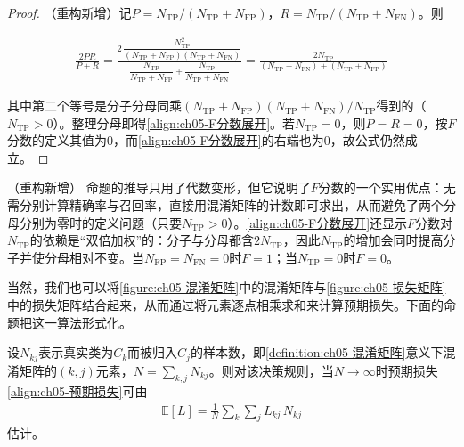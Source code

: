 \documentclass[../../main.tex]{subfiles}
\begin{document}
\begin{proof}
（重构新增）记$P=N_{\mathrm{TP}}/(N_{\mathrm{TP}}+N_{\mathrm{FP}})$，$R=N_{\mathrm{TP}}/(N_{\mathrm{TP}}+N_{\mathrm{FN}})$。则

\begin{align}
  \frac{2PR}{P+R}=\frac{2\,\dfrac{N_{\mathrm{TP}}^{2}}{(N_{\mathrm{TP}}+N_{\mathrm{FP}})(N_{\mathrm{TP}}+N_{\mathrm{FN}})}}{\dfrac{N_{\mathrm{TP}}}{N_{\mathrm{TP}}+N_{\mathrm{FP}}}+\dfrac{N_{\mathrm{TP}}}{N_{\mathrm{TP}}+N_{\mathrm{FN}}}}
  =\frac{2N_{\mathrm{TP}}}{(N_{\mathrm{TP}}+N_{\mathrm{FN}})+(N_{\mathrm{TP}}+N_{\mathrm{FP}})}
\end{align}

其中第二个等号是分子分母同乘$(N_{\mathrm{TP}}+N_{\mathrm{FP}})(N_{\mathrm{TP}}+N_{\mathrm{FN}})/N_{\mathrm{TP}}$得到的（$N_{\mathrm{TP}}>0$）。整理分母即得\eqref{align:ch05-F分数展开}。若$N_{\mathrm{TP}}=0$，则$P=R=0$，按$F$分数的定义其值为0，而\eqref{align:ch05-F分数展开}的右端也为0，故公式仍然成立。
\end{proof}

\begin{remark}（重构新增）
命题的推导只用了代数变形，但它说明了$F$分数的一个实用优点：无需分别计算精确率与召回率，直接用混淆矩阵的计数即可求出，从而避免了两个分母分别为零时的定义问题（只要$N_{\mathrm{TP}}>0$）。\eqref{align:ch05-F分数展开}还显示$F$分数对$N_{\mathrm{TP}}$的依赖是“双倍加权”的：分子与分母都含$2N_{\mathrm{TP}}$，因此$N_{\mathrm{TP}}$的增加会同时提高分子并使分母相对不变。当$N_{\mathrm{FP}}=N_{\mathrm{FN}}=0$时$F=1$；当$N_{\mathrm{TP}}=0$时$F=0$。
\end{remark}

当然，我们也可以将\cref{figure:ch05-混淆矩阵}中的混淆矩阵与\cref{figure:ch05-损失矩阵}中的损失矩阵结合起来，从而通过将元素逐点相乘求和来计算预期损失。下面的命题把这一算法形式化。

\begin{proposition}[由混淆矩阵与损失矩阵计算预期损失]\label{proposition:ch05-混淆损失}
设$N_{kj}$表示真实类为$C_k$而被归入$C_j$的样本数，即\cref{definition:ch05-混淆矩阵}意义下混淆矩阵的$(k,j)$元素，$N=\sum_{k,j}N_{kj}$。则对该决策规则，当$N\to\infty$时预期损失\eqref{align:ch05-预期损失}可由
\begin{align}
  \mathbb{E}[L]=\frac{1}{N}\sum_{k}\sum_{j}L_{kj}\,N_{kj}
  \label{align:ch05-混淆损失}
\end{align}
估计。
\end{proposition}
\end{document}
